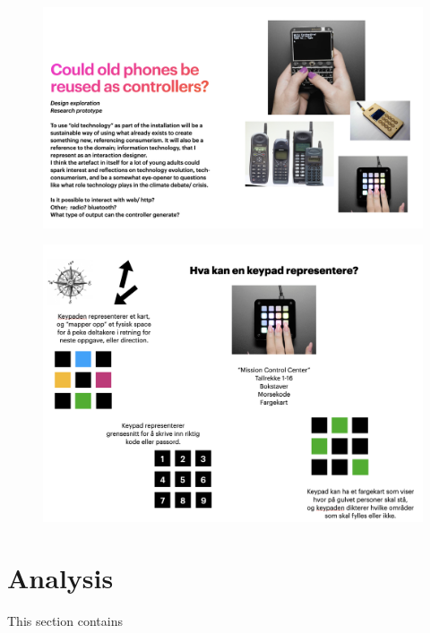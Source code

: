 \begin{figure}[H]
\includegraphics[width=12.5cm]{pictures/appendix/oldphone_pitch.png}
\caption{}
\end{figure}

\begin{figure}[H]
\includegraphics[width=12.5cm]{pictures/appendix/keypad_pitch.png}
\caption{}
\end{figure}



\section{Analysis}
This section contains 

